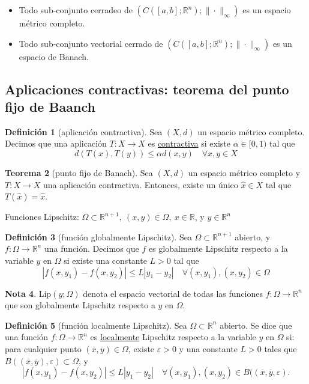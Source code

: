 \documentclass[11pt]{article}
\theoremstyle{definition} %
\newtheorem{theorem}{Teorema}[section]
\newtheorem{definition}[theorem]{Definición}
\newtheorem{note}[theorem]{Nota}
\newcommand{\R}{\mathbb{R}}
\begin{document}
\begin{itemize}
	\item Todo sub-conjunto cerradeo de $(C([a,b];\R^n);\| \cdot \|_{\infty})$ es un espacio métrico completo.

	\item Todo sub-conjunto vectorial cerrado de $(C([a,b];\R^n);\| \cdot \|_{\infty})$ es un espacio de Banach.
\end{itemize}


\subsection{Aplicaciones contractivas: teorema del punto fijo de Baanch}

\begin{definition}[aplicación contractiva]
	Sea $(X,d)$ un espacio métrico completo. Decimos que una aplicación $T: X \to X$ es \underline{contractiva} si existe $\alpha \in [0,1)$ tal que
	\[ d(T(x),T(y)) \leq \alpha d(x,y) \quad \forall x,y \in X \]
\end{definition}

\begin{theorem}[punto fijo de Banach]
	Sea $(X,d)$ un espacio métrico completo y $T: X \to X$ una aplicación contractiva. Entonces, existe un único $\hat{x} \in X$ tal que $T(\hat{x}) = \hat{x}$.
\end{theorem}


Funciones Lipschitz: $\Omega \subset \R^{n+1},\ (x,y) \in \Omega,\ x \in \R$, y $y \in \R^n$

\begin{definition}[función globalmente Lipschitz]
	Sea $\Omega \subset \R^{n+1}$ abierto, y $f : \Omega \to \R^n$ una función. Decimos que $f$ es globalmente Lipschitz respecto a la variable $y$ en $\Omega$ si existe una constante $L>0$ tal que
	\[ |f(x,y_1) - f(x,y_2)| \leq L | y_1 - y_2 | \quad \forall (x,y_1), (x,y_2) \in \Omega \]
\end{definition}

\begin{note}
	Lip$(y;\Omega)$ denota el espacio vectorial de todas las funciones $f:\Omega\to\R^n$ que son globalmente Lipschitz respecto a $y$ en $\Omega$.
\end{note}

\begin{definition}[función localmente Lipschitz]
	Sea $\Omega \subset \R^n$ abierto. Se dice que una función $f: \Omega \to \R^n$ es \underline{localmente} Lipschitz respecto a la variable $y$ en $\Omega$ si: para cualquier punto $(\overline{x}, \overline{y})\in\Omega$, existe $\varepsilon>0$ y una constante $L>0$ tales que $B((\overline{x},\overline{y}),\varepsilon) \subset \Omega$, y 
	\[ |f(x,y_1) - f(x,y_2)| \leq L |y_1 - y_2| \quad \forall (x,y_1),(x,y_2) \in B((\overline{x},\overline{y},\varepsilon). \]
\end{definition}
\end{document}
